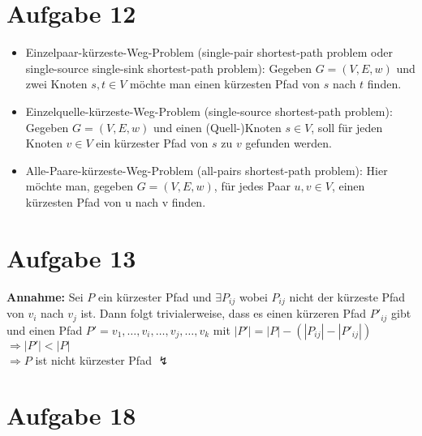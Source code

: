 \documentclass[10pt,a4paper]{article}
\begin{document}
\section*{Aufgabe 12}

    \begin{itemize}
        \item   Einzelpaar-kürzeste-Weg-Problem (single-pair shortest-path problem oder
        single-source single-sink shortest-path problem): Gegeben $G = (V, E, w)$ und zwei
        Knoten $s,t \in V$ möchte man einen kürzesten Pfad von  $s$ nach $t$ finden.
        \item Einzelquelle-kürzeste-Weg-Problem (single-source shortest-path problem):
        Gegeben $G = (V, E, w)$ und einen (Quell-)Knoten $s \in V$, soll für jeden Knoten $v \in V$
        ein kürzester Pfad von $s$ zu $v$ gefunden werden.
        \item Alle-Paare-kürzeste-Weg-Problem (all-pairs shortest-path problem): Hier möchte
		man, gegeben $G = (V, E, w)$, für jedes Paar $u,v \in V$, einen kürzesten Pfad von u nach v
		finden.
	\end{itemize}

\section*{Aufgabe 13}
    \textbf{Annahme: } Sei $P$ ein kürzester Pfad und $\exists P_{ij}$
    wobei $P_{ij}$ nicht der kürzeste Pfad von $v_i$ nach $v_j$ ist.
    Dann folgt trivialerweise, dass es einen kürzeren Pfad $P'_{ij}$ gibt
    und einen Pfad $P' = v_1, \ldots, v_i, \ldots, v_j, \ldots, v_k$ mit
    $|P'| = |P| - (|P_{ij}| - |P'_{ij}|)$ \\ $\Rightarrow |P'| < |P|$
    \\ $\Rightarrow P$ ist nicht kürzester Pfad $\lightning$
    

\section*{Aufgabe 18}
\end{document}
